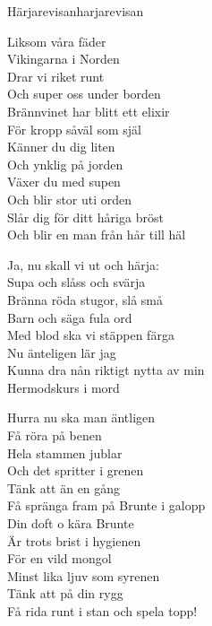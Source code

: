 \begin{song}{Härjarevisan}{harjarevisan}
\begin{vers}
Liksom våra fäder \\
Vikingarna i Norden\\
Drar vi riket runt\\
Och super oss under borden\\
Brännvinet har blitt ett elixir\\
För kropp såväl som själ\\
Känner du dig liten\\
Och ynklig på jorden\\
Växer du med supen\\
Och blir stor uti orden\\
Slår dig för ditt håriga bröst\\
Och blir en man från hår till häl\\
\end{vers}
\begin{vers}
Ja, nu skall vi ut och härja: \\
Supa och slåss och svärja\\
Bränna röda stugor, slå små\\
Barn och säga fula ord\\
Med blod ska vi stäppen färga\\
Nu änteligen lär jag\\
Kunna dra nån riktigt nytta av min\\
Hermodskurs i mord\\
\end{vers}
\newp
\begin{vers}
Hurra nu ska man äntligen \\
Få röra på benen\\
Hela stammen jublar\\
Och det spritter i grenen\\
Tänk att än en gång\\
Få spränga fram på Brunte i galopp\\
Din doft o kära Brunte\\
Är trots brist i hygienen\\
För en vild mongol\\
Minst lika ljuv som syrenen\\
Tänk att på din rygg\\
Få rida runt i stan och spela topp!\\
\end{vers}

\end{song}
